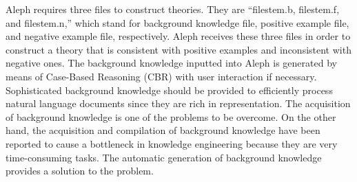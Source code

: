 Aleph requires three files to construct theories. They are “filestem.b, filestem.f, and filestem.n,” which stand for background knowledge file, positive example file, and negative example file, respectively. Aleph receives these three files in order to construct a theory that is consistent with positive examples and inconsistent with negative ones.
The background knowledge inputted into Aleph is generated by means of Case-Based Reasoning (CBR) with user interaction if necessary. Sophisticated background knowledge should be provided to efficiently process natural language documents since they are rich in representation. The acquisition of background knowledge is one of the problems to be overcome. On the other hand, the acquisition and compilation of background knowledge have been reported to cause a bottleneck in knowledge engineering because they are very time-consuming tasks. The automatic generation of background knowledge provides a solution to the problem.

